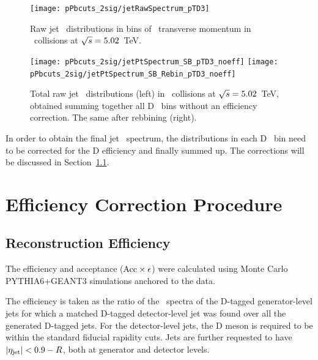\begin{figure}[bth]
\centering
\texttt{[image: pPbcuts\_2sig/jetRawSpectrum\_pTD3]}
\caption{Raw jet \pt\ distributions in bins of \Dzero\ transverse momentum in \pp\ collisions at $\sqrt{s}=5.02$~TeV.}
\label{fig:eq_pPb_signBkgJet_Dzero_Dbins}
\end{figure}

\begin{figure}[bth]
\centering
	\texttt{[image: pPbcuts\_2sig/jetPtSpectrum\_SB\_pTD3\_noeff]}
	\texttt{[image: pPbcuts\_2sig/jetPtSpectrum\_SB\_Rebin\_pTD3\_noeff]}
\caption{Total raw jet \pt\ distributions (left) in \pp\ collisions at $\sqrt{s}=5.02$~TeV, obtained summing together all D \pt\ bins without an efficiency correction. The same after rebbining (right).}
\label{fig:eq_pPb_signBkgJet_tot}
\end{figure}

In order to obtain the final jet \pt\ spectrum, the distributions in each D \pt\ bin need to be corrected for the D efficiency and finally summed up.
The corrections will be discussed in Section~\ref{sect:sub_DmesonRecEff}. 



\section{Efficiency Correction Procedure}

\subsection{Reconstruction Efficiency}
\label{sect:sub_DmesonRecEff}
The efficiency and acceptance (${\rm Acc} \times \epsilon$) were calculated using Monte Carlo PYTHIA6+GEANT3 simulations anchored to the data.

The efficiency is taken as the ratio of the \ptd\ spectra of the D-tagged generator-level jets for which a matched
D-tagged detector-level jet was found over all the generated D-tagged jets.
For the detector-level jets, the D meson is required to be within the standard fiducial rapidity cuts.
Jets are further requested to have $|\eta_{\rm jet}| < 0.9 - R$, both at generator and detector levels.

